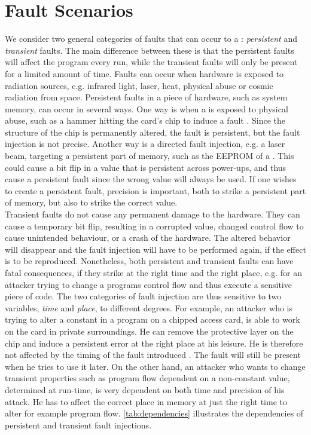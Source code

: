 \section{Fault Scenarios}
We consider two general categories of faults that can occur to a \jc: \textit{persistent} and \textit{transient} faults. The main difference between these is that the persistent faults will affect the program every run, while the transient faults will only be present for a limited amount of time. Faults can occur when hardware is exposed to radiation sources, e.g. infrared light, laser, heat, physical abuse or cosmic radiation from space. 
Persistent faults in a piece of hardware, such as system memory, can occur in several ways. One way is when a \jc is exposed to physical abuse, such as a hammer hitting the card's chip to induce a fault . Since the structure of the chip is permanently altered, the fault is persistent, but the fault injection is not precise. Another way is a directed fault injection, e.g. a laser beam, targeting a persistent part of memory, such as the EEPROM of a \jc. This could cause a bit flip in a value that is persistent across power-ups, and thus cause a persistent fault since the wrong value will always be used. If one wishes to create a persistent fault, precision is important, both to strike a persistent part of memory, but also to strike the correct value.\\


Transient faults do not cause any permanent damage to the hardware. They can cause a temporary bit flip, resulting in a corrupted value, changed control flow to cause unintended behaviour, or a crash of the hardware. The altered behavior will disappear and the fault injection will have to be performed again, if the effect is to be reproduced.
Nonetheless, both persistent and transient faults can have fatal consequences, if they strike at the right time and the right place, e.g. for an attacker trying to change a programs control flow and thus execute a sensitive piece of code. The two categories of fault injection are thus sensitive to two variables, \textit{time} and \textit{place}, to different degrees. For example, an attacker who is trying to alter a constant in a program on a chipped access card, is able to work on the card in private surroundings. He can remove the protective layer on the chip and induce a persistent error at the right place at his leisure. He is therefore not affected by the timing of the fault introduced . The fault will still be present when he tries to use it later. On the other hand, an attacker who wants to change transient properties such as program flow dependent on a non-constant value, determined at run-time, is very dependent on both time and precision of his attack. He has to affect the correct place in memory at just the right time to alter for example program flow. \cref{tab:dependencies} illustrates the dependencies of persistent and transient fault injections.

